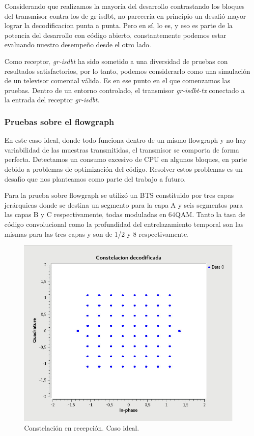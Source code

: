 Considerando que realizamos la mayoría del desarrollo contrastando los bloques del transmisor contra los de gr-isdbt, no parecería en principio un desafió mayor lograr la decodificacion punta a punta. Pero en sí, lo es, y eso es parte de la potencia del desarrollo con código abierto, constantemente podemos estar evaluando nuestro desempeño desde el otro lado. 

Como receptor, \textit{gr-isdbt} ha sido sometido a una diversidad de pruebas con resultados satisfactorios, por lo tanto, podemos considerarlo como una simulación de un televisor comercial válida. Es en ese punto en el que comenzamos las pruebas. Dentro de un entorno controlado, el transmisor \textit{gr-isdbt-tx} conectado a la entrada del receptor \textit{gr-isdbt}.

\subsubsection{Pruebas sobre el flowgraph}

En este caso ideal, donde todo funciona dentro de un mismo flowgraph y no hay variabilidad de las muestras transmitidas, el transmisor se comporta de forma perfecta. Detectamos un consumo excesivo de CPU en algunos bloques, en parte debido a problemas de optimización del código. Resolver estos problemas es un desafío que nos planteamos como parte del trabajo a futuro.

Para la prueba sobre flowgraph se utilizó un BTS constituido por tres capas jerárquicas donde se destina un segmento para la capa A y seis segmentos para las capas B y C respectivamente, todas moduladas en 64QAM. Tanto la tasa de código convolucional como la profundidad del entrelazamiento temporal son las mismas para las tres capas y son de 1/2 y 8 respectivamente. 

\begin{figure}[!h]
	\centering
	\includegraphics[scale=0.5]{figuras/cap06/const_rec}
	\caption{\label{f:const_rec} Constelación en recepción. Caso ideal.}
\end{figure}

